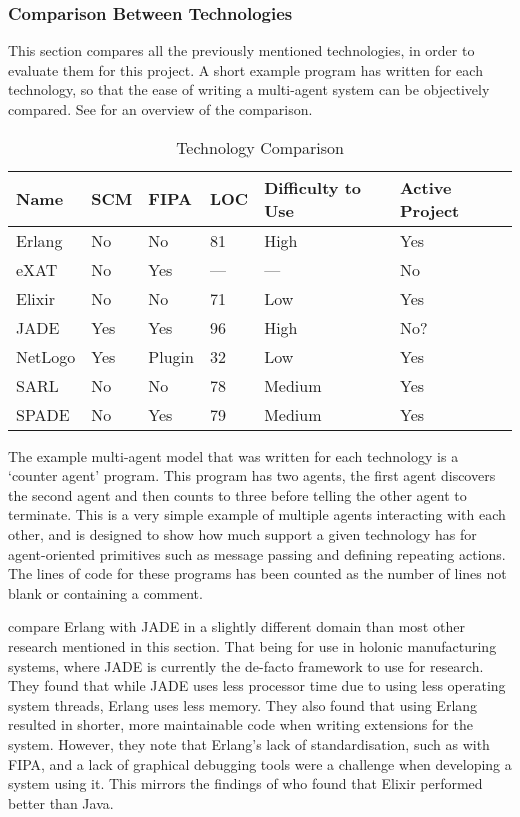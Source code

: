 \subsubsection{Comparison Between Technologies}

This section compares all the previously mentioned technologies, in order to evaluate them for this project.
A short example program has written for each technology, so that the ease of writing a multi-agent system can be objectively compared.
See  for an overview of the comparison.

\begin{table}[h]
    \centering
    \caption{Technology Comparison}\label{tab:tech_comparison}
    \begin{tabular}{llllll}
        \toprule
        Name & SCM & FIPA & LOC & Difficulty to Use & Active Project\\
        \midrule
        Erlang & No & No & 81 & High & Yes\\[0.5ex]
        eXAT & No & Yes & --- & --- & No\\[0.5ex]
        Elixir & No & No & 71 & Low & Yes\\[0.5ex]
        JADE & Yes & Yes & 96 & High & No?\\[0.5ex]
        NetLogo & Yes & Plugin & 32 & Low & Yes\\[0.5ex]
        SARL & No & No & 78 & Medium & Yes\\[0.5ex]
        SPADE & No & Yes & 79 & Medium & Yes\\
        \bottomrule
    \end{tabular}
\end{table}

The example multi-agent model that was written for each technology is a `counter agent' program.
This program has two agents, the first agent discovers the second agent and then counts to three before telling the other agent to terminate.
This is a very simple example of multiple agents interacting with each other, and is designed to show how much support a given technology has for agent-oriented primitives such as message passing and defining repeating actions.
The lines of code for these programs has been counted as the number of lines not blank or containing a comment.

 compare Erlang with JADE in a slightly different domain than most other research mentioned in this section.
That being for use in holonic manufacturing systems, where JADE is currently the de-facto framework to use for research.
They found that while JADE uses less processor time due to using less operating system threads, Erlang uses less memory.
They also found that using Erlang resulted in shorter, more maintainable code when writing extensions for the system.
However, they note that Erlang's lack of standardisation, such as with FIPA, and a lack of graphical debugging tools were a challenge when developing a system using it.
This mirrors the findings of  who found that Elixir performed better than Java.

